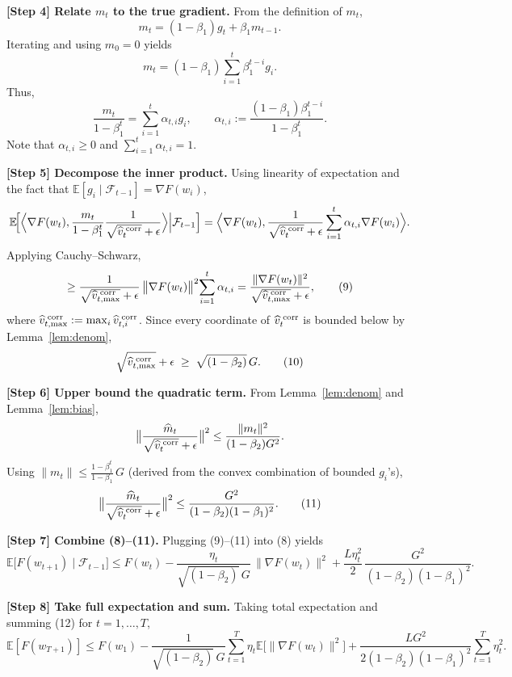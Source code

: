 \documentclass{article}
\begin{document}
\noindent\textbf{[Step 4] Relate $m_t$ to the true gradient.}
From the definition of $m_t$,
\[
m_t = (1-\beta_1)g_t + \beta_1 m_{t-1}.
\]
Iterating and using $m_0=0$ yields
\[
m_t = (1-\beta_1)\sum_{i=1}^{t}\beta_1^{t-i}g_i .
\]
Thus,
\[
\frac{m_t}{1-\beta_1^{t}} = \sum_{i=1}^{t}\alpha_{t,i} g_i,\qquad
\alpha_{t,i}:=\frac{(1-\beta_1)\beta_1^{t-i}}{1-\beta_1^{t}}.
\]
Note that $\alpha_{t,i}\ge0$ and $\sum_{i=1}^{t}\alpha_{t,i}=1$.

\noindent\textbf{[Step 5] Decompose the inner product.}
Using linearity of expectation and the fact that $\mathbb{E}[g_i\mid\mathcal{F}_{t-1}]=\nabla F(w_i)$,
\[
\mathbb{E}\!\Bigl[\Big\langle\nabla F(w_t),\frac{m_t}{1-\beta_1^{t}}\frac{1}{\sqrt{\widehat v_t^{\;{\rm corr}}}+\epsilon}\Big\rangle\Big|\mathcal{F}_{t-1}\Bigr]
= \Big\langle\nabla F(w_t),\frac{1}{\sqrt{\widehat v_t^{\;{\rm corr}}}+\epsilon}\sum_{i=1}^{t}\alpha_{t,i}\nabla F(w_i)\Bigr\rangle .
\]
Applying Cauchy–Schwarz,
\[
\ge \frac{1}{\sqrt{\widehat v_{t,\max}^{\;{\rm corr}}}+\epsilon}\,
\big\|\nabla F(w_t)\big\|^{2}\!\sum_{i=1}^{t}\alpha_{t,i}
= \frac{\|\nabla F(w_t)\|^{2}}{\sqrt{\widehat v_{t,\max}^{\;{\rm corr}}}+\epsilon},
\tag{9}
\]
where $\widehat v_{t,\max}^{\;{\rm corr}}:=\max_{i}\widehat v_{t,i}^{\;{\rm corr}}$.
Since every coordinate of $\widehat v_{t}^{\;{\rm corr}}$ is bounded below by Lemma~\ref{lem:denom},
\[
\sqrt{\widehat v_{t,\max}^{\;{\rm corr}}}+\epsilon\;\ge\;\sqrt{(1-\beta_2)}\,G . \tag{10}
\]

\noindent\textbf{[Step 6] Upper bound the quadratic term.}
From Lemma~\ref{lem:denom} and Lemma~\ref{lem:bias},
\[
\big\|\frac{\widehat m_t}{\sqrt{\widehat v_t^{\;{\rm corr}}}+\epsilon}\big\|^{2}
\le \frac{\|m_t\|^{2}}{(1-\beta_2)G^{2}} .
\]
Using $\|m_t\|\le\frac{1-\beta_1^{t}}{1-\beta_1}\,G$ (derived from the convex combination of bounded $g_i$'s),
\[
\big\|\frac{\widehat m_t}{\sqrt{\widehat v_t^{\;{\rm corr}}}+\epsilon}\big\|^{2}
\le \frac{G^{2}}{(1-\beta_2)(1-\beta_1)^{2}} . \tag{11}
\]

\noindent\textbf{[Step 7] Combine (8)–(11).}
Plugging (9)–(11) into (8) yields
\[
\mathbb{E}\!\bigl[F(w_{t+1})\mid\mathcal{F}_{t-1}\bigr]
\le F(w_t) -\frac{\eta_t}{\sqrt{(1-\beta_2)}\,G}\,\|\nabla F(w_t)\|^{2}
+ \frac{L\eta_t^{2}}{2}\,\frac{G^{2}}{(1-\beta_2)(1-\beta_1)^{2}} . \tag{12}
\]

\noindent\textbf{[Step 8] Take full expectation and sum.}
Taking total expectation and summing (12) for $t=1,\dots,T$,
\[
\mathbb{E}[F(w_{T+1})] \le F(w_1) -\frac{1}{\sqrt{(1-\beta_2)}\,G}
\sum_{t=1}^{T}\eta_t\mathbb{E}\!\bigl[\|\nabla F(w_t)\|^{2}\bigr]
+ \frac{L G^{2}}{2(1-\beta_2)(1-\beta_1)^{2}}
\sum_{t=1}^{T}\eta_t^{2}. \tag{13}
\]
\end{document}
